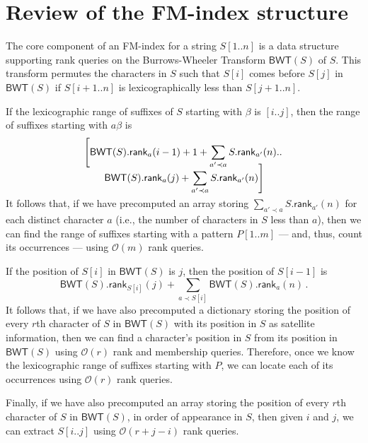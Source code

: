 \documentclass{llncs}
\newcommand{\Oh}[1]
  {\ensuremath{\mathcal{O}\!\left( {#1} \right)}}
\newcommand{\BWT}
  {\ensuremath{\mathsf{BWT}}}
\newcommand{\rank}
  {\ensuremath{\mathsf{rank}}}
\begin{document}
\section{Review of the FM-index structure} \label{sec:review}

The core component of an FM-index for a string \(S [1..n]\) is a data
structure supporting rank queries on the Burrows-Wheeler
Transform \(\BWT (S)\) of $S$.  This transform permutes the
characters in $S$ such that \(S [i]\) comes before \(S [j]\) in \(\BWT (S)\)
if \(S [i + 1..n]\) is lexicographically less than \(S [j + 1..n]\).

If the lexicographic range of suffixes of $S$ starting with $\beta$ is
\([i..j]\), then the range of suffixes starting with \(a \beta\) is
\begin{multline*}
\left[ \BWT (S).\rank_a (i - 1) + 1 + \sum_{a' \prec a} S.\rank_{a'} (n).. \right.\\[-2ex]
\vspace{-1ex} \left. \BWT (S).\rank_a (j) + \sum_{a' \prec a} S.\rank_{a'} (n) \right]
\end{multline*}
It follows that, if we have precomputed an array storing \(\sum_{a' \prec a}
S.\rank_{a'} (n)\) for each distinct character $a$ (i.e., the number of
characters in $S$ less than $a$), then we can find the range of suffixes
starting with a pattern \(P [1..m]\) --- and, thus, count its occurrences ---
using $\Oh{m}$ rank queries.

If the position of \(S [i]\) in \(\BWT (S)\) is $j$, then the position of \(S
[i - 1]\) is
\[\BWT(S).\rank_{S [i]} (j) + \sum_{a \prec S [i]} \BWT (S).\rank_{a} (n)\,.\]
It follows that, if we have also precomputed a dictionary storing the
position of every $r$th character of $S$ in \(\BWT (S)\) with its position in
$S$ as satellite information, then we can find a character's position in $S$
from its position in \(\BWT (S)\) using $\Oh{r}$ rank and membership queries.
Therefore, once we know the lexicographic range of suffixes starting with
$P$, we can locate each of its occurrences using $\Oh{r}$ rank queries.


Finally, if we have also precomputed an array storing the position of every
$r$th character of $S$ in \(\BWT (S)\), in order of appearance in $S$, then
given $i$ and $j$, we can extract \(S [i..j]\) using $\Oh{r + j - i}$ rank
queries.



\end{document}
